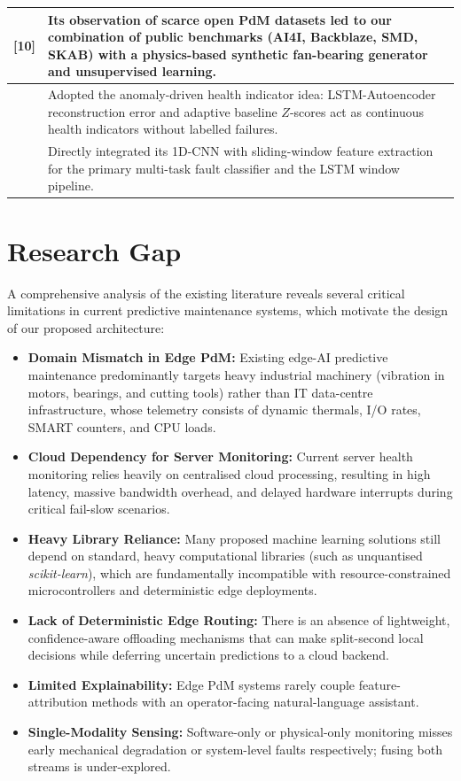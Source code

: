 \documentclass[12pt,a4paper]{report}
\begin{document}
\begin{table}[h!]
\begin{tabular}{|c|p{12.6cm}|}
    [10] & Its observation of scarce open PdM datasets led to our combination of public benchmarks (AI4I, Backblaze, SMD, SKAB) with a physics-based synthetic fan-bearing generator and unsupervised learning. \\ \hline
    [11] & Adopted the anomaly-driven health indicator idea: LSTM-Autoencoder reconstruction error and adaptive baseline $Z$-scores act as continuous health indicators without labelled failures. \\ \hline
    [12] & Directly integrated its 1D-CNN with sliding-window feature extraction for the primary multi-task fault classifier and the LSTM window pipeline. \\ \hline
  \end{tabular}
\end{table}

\clearpage
\section{Research Gap}

A comprehensive analysis of the existing literature reveals several critical limitations in current predictive maintenance systems, which motivate the design of our proposed architecture:

\begin{itemize}
  \item \textbf{Domain Mismatch in Edge PdM:} Existing edge-AI predictive maintenance predominantly targets heavy industrial machinery (vibration in motors, bearings, and cutting tools) rather than IT data-centre infrastructure, whose telemetry consists of dynamic thermals, I/O rates, SMART counters, and CPU loads.
  \item \textbf{Cloud Dependency for Server Monitoring:} Current server health monitoring relies heavily on centralised cloud processing, resulting in high latency, massive bandwidth overhead, and delayed hardware interrupts during critical fail-slow scenarios.
  \item \textbf{Heavy Library Reliance:} Many proposed machine learning solutions still depend on standard, heavy computational libraries (such as unquantised \textit{scikit-learn}), which are fundamentally incompatible with resource-constrained microcontrollers and deterministic edge deployments.
  \item \textbf{Lack of Deterministic Edge Routing:} There is an absence of lightweight, confidence-aware offloading mechanisms that can make split-second local decisions while deferring uncertain predictions to a cloud backend.
  \item \textbf{Limited Explainability:} Edge PdM systems rarely couple feature-attribution methods with an operator-facing natural-language assistant.
  \item \textbf{Single-Modality Sensing:} Software-only or physical-only monitoring misses early mechanical degradation or system-level faults respectively; fusing both streams is under-explored.
\end{itemize}
\end{document}
